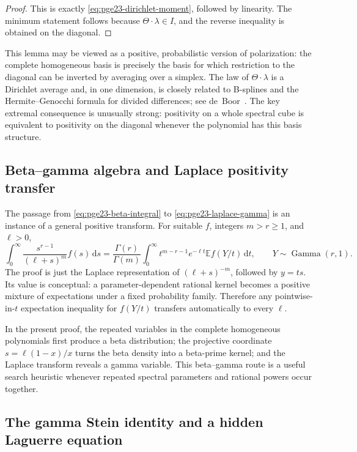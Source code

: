 \documentclass[11pt]{article}
\numberwithin{equation}{section}
\newcommand{\dd}{\,\mathrm d}
\newcommand{\E}{\mathbb E}
\newcommand{\GammaLaw}{\operatorname{Gamma}}
\begin{document}
\begin{proof}
  This is exactly \eqref{eq:pge23-dirichlet-moment}, followed by linearity.
  The minimum statement follows because $\Theta\cdot\lambda\in I$, and the reverse inequality is obtained on the diagonal.
\end{proof}

This lemma may be viewed as a positive, probabilistic version of polarization: the complete homogeneous basis is precisely the basis for which restriction to the diagonal can be inverted by averaging over a simplex.
The law of $\Theta\cdot\lambda$ is a Dirichlet average and, in one dimension, is closely related to B-splines and the Hermite--Genocchi formula for divided differences; see de~Boor~\cite{deBoor2005}.
The key extremal consequence is unusually strong: positivity on a whole spectral cube is equivalent to positivity on the diagonal whenever the polynomial has this basis structure.

\subsection{Beta--gamma algebra and Laplace positivity transfer}

The passage from \eqref{eq:pge23-beta-integral} to \eqref{eq:pge23-laplace-gamma} is an instance of a general positive transform.
For suitable $f$, integers $m>r\ge1$, and $\ell>0$,
\begin{equation}\label{eq:general-laplace-transfer}
  \int_0^\infty\frac{s^{r-1}}{(\ell+s)^m}f(s)\dd s
  =\frac{\Gamma(r)}{\Gamma(m)}
  \int_0^\infty t^{m-r-1}e^{-\ell t}
  \E f(Y/t)\dd t,
  \qquad Y\sim\GammaLaw(r,1).
\end{equation}
The proof is just the Laplace representation of $(\ell+s)^{-m}$, followed by $y=ts$.
Its value is conceptual: a parameter-dependent rational kernel becomes a positive mixture of expectations under a fixed probability family.
Therefore any pointwise-in-$t$ expectation inequality for $f(Y/t)$ transfers automatically to every $\ell$.

In the present proof, the repeated variables in the complete homogeneous polynomials first produce a beta distribution; the projective coordinate $s=\ell(1-x)/x$ turns the beta density into a beta-prime kernel; and the Laplace transform reveals a gamma variable.
This beta--gamma route is a useful search heuristic whenever repeated spectral parameters and rational powers occur together.

\subsection{The gamma Stein identity and a hidden Laguerre equation}
\end{document}
